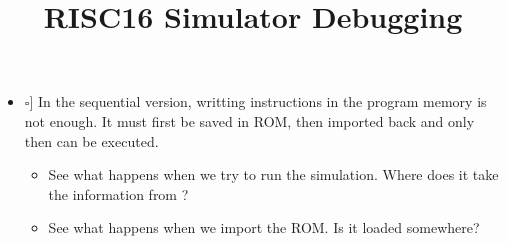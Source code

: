 \documentclass[12pt,a4paper]{extarticle}
\title{RISC16 Simulator Debugging}
\newcommand{\notdone}{\makebox[1em][l]{$\square$}}
\begin{document}
\maketitle


\begin{itemize}
  \item[\notdone] In the sequential version, writting instructions in the program memory is not enough.
  It must first be saved in ROM, then imported back and only then can be executed.
  \begin{itemize}
    \item See what happens when we try to run the simulation. Where does it take the information from ?
    \item See what happens when we import the ROM. Is it loaded somewhere?
  \end{itemize}

\end{itemize}
\end{document}
